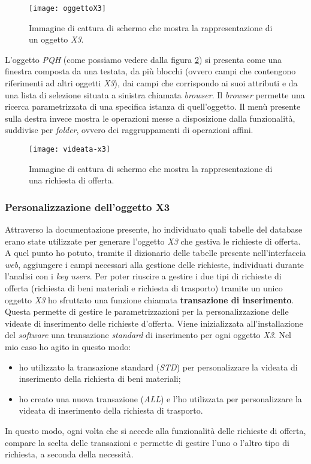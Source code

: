 \begin{figure}[htbp]
	\begin{center}
		\texttt{[image: oggettoX3]}
		\caption{Immagine di cattura di schermo che mostra la rappresentazione di un oggetto \textit{X3}.}
		\label{fig:oggetto-x3}
	\end{center}
\end{figure}

\newpage
L'oggetto \textit{PQH} (come possiamo vedere dalla figura \ref{fig:pqh-x3}) si presenta come una finestra composta da una testata, da più blocchi (ovvero campi che contengono riferimenti ad altri oggetti \textit{X3}), dai campi che corrispondo ai suoi attributi e da una lista di selezione situata a sinistra chiamata \textit{browser}. Il \textit{browser} permette una ricerca parametrizzata di una specifica istanza di quell'oggetto. Il menù presente sulla destra invece mostra le operazioni messe a disposizione dalla funzionalità, suddivise per \textit{folder}, ovvero dei raggruppamenti di operazioni affini.

\begin{figure}[htbp]
	\begin{center}
		\texttt{[image: videata-x3]}
		\caption{Immagine di cattura di schermo che mostra la rappresentazione di una richiesta di offerta.}
		\label{fig:pqh-x3}
	\end{center}
\end{figure}


\subsubsection{Personalizzazione dell'oggetto X3}
Attraverso la documentazione presente, ho individuato quali tabelle del database erano state utilizzate per generare l'oggetto \textit{X3} che gestiva le richieste di offerta.
A quel punto ho potuto, tramite il dizionario delle tabelle presente nell'interfaccia \textit{web}, aggiungere i campi necessari alla gestione delle richieste, individuati durante l'analisi con i \textit{key users}.
Per poter riuscire a gestire i due tipi di richieste di offerta (richiesta di beni materiali e richiesta di trasporto) tramite un unico oggetto \textit{X3} ho sfruttato una funzione chiamata \textbf{transazione di inserimento}.
Questa permette di gestire le parametrizzazioni per la personalizzazione delle videate di inserimento delle richieste d'offerta.
Viene inizializzata all'installazione del \textit{software} una transazione \textit{standard} di inserimento per ogni oggetto \textit{X3}. 
Nel mio caso ho agito in questo modo:
\begin{itemize}
	\item ho utilizzato la transazione standard (\textit{STD}) per personalizzare la videata di inserimento della richiesta di beni materiali;
	\item ho creato una nuova transazione (\textit{ALL}) e l'ho utilizzata per personalizzare la videata di inserimento della richiesta di trasporto.
\end{itemize}
In questo modo, ogni volta che si accede alla funzionalità delle richieste di offerta, compare la scelta delle transazioni e permette di gestire l'uno o l'altro tipo di richiesta, a seconda della necessità.

